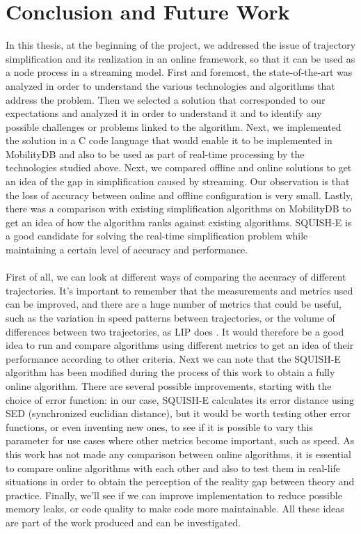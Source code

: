 
\chapter{Conclusion and Future Work}

In this thesis, at the beginning of the project, we addressed the issue of trajectory simplification and its realization in an online framework, so that it can be used as a node process in a streaming model. First and foremost, the state-of-the-art was analyzed in order to understand the various technologies and algorithms that address the problem. Then we selected a solution that corresponded to our expectations and analyzed it in order to understand it and to identify any possible challenges or problems linked to the algorithm. Next, we implemented the solution in a C code language that would enable it to be implemented in MobilityDB and also to be used as part of real-time processing by the technologies studied above. Next, we compared offline and online solutions to get an idea of the gap in simplification caused by streaming. Our observation is that the loss of accuracy between online and offline configuration is very small.  Lastly, there was a comparison with existing simplification algorithms on MobilityDB to get an idea of how the algorithm ranks against existing algorithms. SQUISH-E is a good candidate for solving the real-time simplification problem while maintaining a certain level of accuracy and performance. \\\\
First of all, we can look at different ways of comparing the accuracy of different trajectories. It's important to remember that the measurements and metrics used can be improved, and there are a huge number of metrics that could be useful, such as the variation in speed patterns between trajectories, or the volume of differences between two trajectories, as LIP does \cite{4438678}. It would therefore be a good idea to run and compare algorithms using different metrics to get an idea of their performance according to other criteria. Next we can note that the SQUISH-E algorithm has been modified during the process of this work to obtain a fully online algorithm. There are several possible improvements, starting with the choice of error function: in our case, SQUISH-E calculates its error distance using SED (synchronized euclidian distance), but it would be worth testing other error functions, or even inventing new ones, to see if it is possible to vary this parameter for use cases where other metrics become important, such as speed. As this work has not made any comparison between online algorithms, it is essential to compare online algorithms with each other and also to test them in real-life situations in order to obtain the perception of the reality gap between theory and practice. Finally, we'll see if we can improve implementation to reduce possible memory leaks, or code quality to make code more maintainable. All these ideas are part of the work produced and can be investigated.
